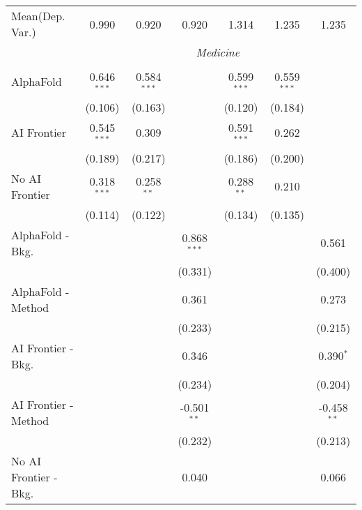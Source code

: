\begin{tabular}{lcccccc}
Mean(Dep. Var.) & 0.990 & 0.920 & 0.920 & 1.314 & 1.235 & 1.235 \\
 & \multicolumn{6}{c}{\textit{Medicine}} \\ \\
   AlphaFold               & 0.646$^{***}$ & 0.584$^{***}$ &               & 0.599$^{***}$ & 0.559$^{***}$ &   \\   
                           & (0.106)       & (0.163)       &               & (0.120)       & (0.184)       &   \\   
   AI Frontier             & 0.545$^{***}$ & 0.309         &               & 0.591$^{***}$ & 0.262         &   \\   
                           & (0.189)       & (0.217)       &               & (0.186)       & (0.200)       &   \\   
   No AI Frontier          & 0.318$^{***}$ & 0.258$^{**}$  &               & 0.288$^{**}$  & 0.210         &   \\   
                           & (0.114)       & (0.122)       &               & (0.134)       & (0.135)       &   \\   
   AlphaFold - Bkg.        &               &               & 0.868$^{***}$ &               &               & 0.561\\   
                           &               &               & (0.331)       &               &               & (0.400)\\   
   AlphaFold - Method      &               &               & 0.361         &               &               & 0.273\\   
                           &               &               & (0.233)       &               &               & (0.215)\\   
   AI Frontier - Bkg.      &               &               & 0.346         &               &               & 0.390$^{*}$\\   
                           &               &               & (0.234)       &               &               & (0.204)\\   
   AI Frontier - Method    &               &               & -0.501$^{**}$ &               &               & -0.458$^{**}$\\   
                           &               &               & (0.232)       &               &               & (0.213)\\   
   No AI Frontier - Bkg.   &               &               & 0.040         &               &               & 0.066\\   

\end{tabular}
